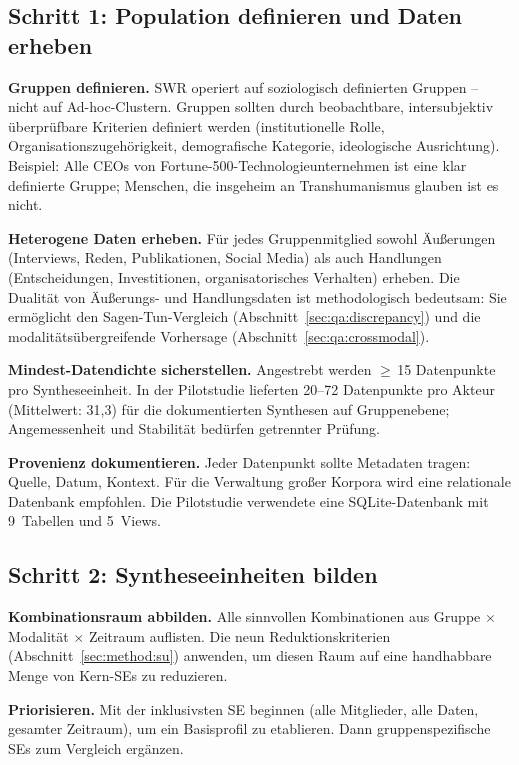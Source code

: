 \documentclass[11pt,a4paper]{article}
\begin{document}
\subsection{Schritt 1: Population definieren und Daten erheben}
\label{sec:app:step1}

\textbf{Gruppen definieren.} SWR operiert auf soziologisch definierten Gruppen -- nicht auf Ad-hoc-Clustern. Gruppen sollten durch beobachtbare, intersubjektiv überprüfbare Kriterien definiert werden (institutionelle Rolle, Organisationszugehörigkeit, demografische Kategorie, ideologische Ausrichtung). Beispiel: \glqq{}Alle CEOs von Fortune-500-Technologieunternehmen\grqq{} ist eine klar definierte Gruppe; \glqq{}Menschen, die insgeheim an Transhumanismus glauben\grqq{} ist es nicht.

\textbf{Heterogene Daten erheben.} Für jedes Gruppenmitglied sowohl Äußerungen (Interviews, Reden, Publikationen, Social Media) als auch Handlungen (Entscheidungen, Investitionen, organisatorisches Verhalten) erheben. Die Dualität von Äußerungs- und Handlungsdaten ist methodologisch bedeutsam: Sie ermöglicht den Sagen-Tun-Vergleich (Abschnitt~\ref{sec:qa:discrepancy}) und die modalitätsübergreifende Vorhersage (Abschnitt~\ref{sec:qa:crossmodal}).

\textbf{Mindest-Datendichte sicherstellen.} Angestrebt werden $\geq$\,15 Datenpunkte pro Syntheseeinheit. In der Pilotstudie lieferten 20--72 Datenpunkte pro Akteur (Mittelwert: 31,3) für die dokumentierten Synthesen auf Gruppenebene; Angemessenheit und Stabilität bedürfen getrennter Prüfung.

\textbf{Provenienz dokumentieren.} Jeder Datenpunkt sollte Metadaten tragen: Quelle, Datum, Kontext. Für die Verwaltung großer Korpora wird eine relationale Datenbank empfohlen. Die Pilotstudie verwendete eine SQLite-Datenbank mit 9~Tabellen und 5~Views.

\subsection{Schritt 2: Syntheseeinheiten bilden}
\label{sec:app:step2}

\textbf{Kombinationsraum abbilden.} Alle sinnvollen Kombinationen aus Gruppe $\times$ Modalität $\times$ Zeitraum auflisten. Die neun Reduktionskriterien (Abschnitt~\ref{sec:method:su}) anwenden, um diesen Raum auf eine handhabbare Menge von Kern-SEs zu reduzieren.

\textbf{Priorisieren.} Mit der inklusivsten SE beginnen (alle Mitglieder, alle Daten, gesamter Zeitraum), um ein Basisprofil zu etablieren. Dann gruppenspezifische SEs zum Vergleich ergänzen.
\end{document}

